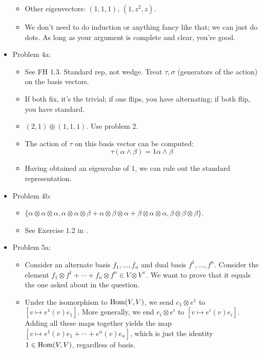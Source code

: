 \documentclass[../notes.tex]{subfiles}
\begin{document}
\begin{itemize}
\begin{itemize}
        \item Other eigenvectors: $(1,1,1)$, $(1,z^2,z)$.
        \item We don't need to do induction or anything fancy like that; we can just do dots. As long as your argument is complete and clear, you're good.
    \end{itemize}
    \item Problem 4a:
    \begin{itemize}
        \item See FH 1.3. Standard rep, not wedge. Treat $\tau,\sigma$ (generators of the action) on the basis vectors.
        \item If both fix, it's the trivial; if one flips, you have alternating; if both flip, you have standard.
        \item $(2,1)\oplus(1,1,1)$. Use problem 2.
        \item The action of $\tau$ on this basis vector can be computed:
        \begin{equation*}
            \tau(\alpha\wedge\beta) = 1\alpha\wedge\beta
        \end{equation*}
        \item Having obtained an eigenvalue of 1, we can rule out the standard representation. 
    \end{itemize}
    \item Problem 4b:
    \begin{itemize}
        \item $\{\alpha\otimes\alpha\otimes\alpha,\alpha\otimes\alpha\otimes\beta+\alpha\otimes\beta\otimes\alpha+\beta\otimes\alpha\otimes\alpha,\beta\otimes\beta\otimes\beta\}$.
        \item See Exercise 1.2 in \textcite{bib:FultonHarris}.
    \end{itemize}
    \item Problem 5a:
    \begin{itemize}
        \item Consider an alternate basis $f_1,\dots,f_n$ and dual basis $f^1,\dots,f^n$. Consider the element $f_1\otimes f^1+\cdots+f_n\otimes f^n\in V\otimes V^\vee$. We want to prove that it equals the one asked about in the question.
        \item Under the isomorphism to $\operatorname{Hom}(V,V)$, we send $e_1\otimes e^1$ to $[v\mapsto e^1(v)e_1]$. More generally, we end $e_i\otimes e^i$ to $[v\mapsto e^i(v)e_i]$. Adding all these maps together yields the map $[v\mapsto e^1(v)e_1+\cdots+e^n(v)e_n]$, which is just the identity $1\in\operatorname{Hom}(V,V)$, regardless of basis.

\end{itemize}
\end{itemize}
\end{document}
